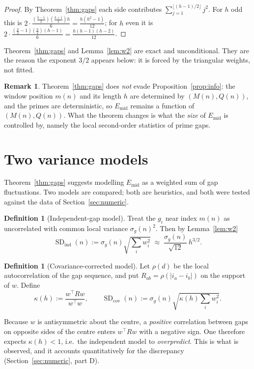 \documentclass[11pt]{amsart}
\theoremstyle{definition}
\newtheorem{definition}[theorem]{Definition}
\newtheorem{remark}[theorem]{Remark}
\newcommand{\Mert}{M}
\newcommand{\Sq}{Q}
\begin{document}
\begin{proof}
By Theorem~\ref{thm:gaps} each side contributes
$\sum_{j=1}^{\lfloor (h-1)/2\rfloor}j^{2}$. For $h$ odd this is
$2\cdot\frac{(\frac{h-1}2)(\frac{h+1}2)h}{6}=\frac{h(h^{2}-1)}{12}$; for $h$ even
it is $2\cdot\frac{(\frac h2-1)(\frac h2)(h-1)}{6}=\frac{h(h-1)(h-2)}{12}$.
\end{proof}

Theorem~\ref{thm:gaps} and Lemma~\ref{lem:w2} are exact and unconditional. They
are the reason the exponent $3/2$ appears below: it is forced by the triangular
weights, not fitted.

\begin{remark}
Theorem~\ref{thm:gaps} does \emph{not} evade Proposition~\ref{prop:info}: the
window position $m(n)$ and its length $h$ are determined by
$(\Mert(n),\Sq(n))$, and the primes are deterministic, so $E_{\mathrm{mid}}$
remains a function of $(\Mert(n),\Sq(n))$. What the theorem changes is what the
\emph{size} of $E_{\mathrm{mid}}$ is controlled by, namely the local second-order
statistics of prime gaps.
\end{remark}

\section{Two variance models}

Theorem~\ref{thm:gaps} suggests modelling $E_{\mathrm{mid}}$ as a weighted sum
of gap fluctuations. Two models are compared; both are heuristics, and both were
tested against the data of Section~\ref{sec:numeric}.

\begin{definition}[Independent-gap model]
Treat the $g_i$ near index $m(n)$ as uncorrelated with common local variance
$\sigma_g(n)^{2}$. Then by Lemma~\ref{lem:w2}
\[
\operatorname{SD}_{\mathrm{ind}}(n):=\sigma_g(n)\sqrt{\textstyle\sum_i w_i^{2}}
\;\approx\;\frac{\sigma_g(n)}{\sqrt{12}}\,h^{3/2}.
\]
\end{definition}

\begin{definition}[Covariance-corrected model]
Let $\rho(d)$ be the local autocorrelation of the gap sequence, and put
$R_{ab}=\rho(|i_a-i_b|)$ on the support of $w$. Define
\[
\kappa(h):=\frac{w^{\!\top}Rw}{w^{\!\top}w},
\qquad
\operatorname{SD}_{\mathrm{cov}}(n):=\sigma_g(n)\sqrt{\kappa(h)\textstyle\sum_i w_i^{2}} .
\]
\end{definition}

Because $w$ is antisymmetric about the centre, a \emph{positive} correlation
between gaps on opposite sides of the centre enters $w^{\!\top}Rw$ with a
negative sign. One therefore expects $\kappa(h)<1$, i.e.\ the independent model
to \emph{overpredict}. This is what is observed, and it accounts quantitatively
for the discrepancy (Section~\ref{sec:numeric}, part D).
\end{document}
